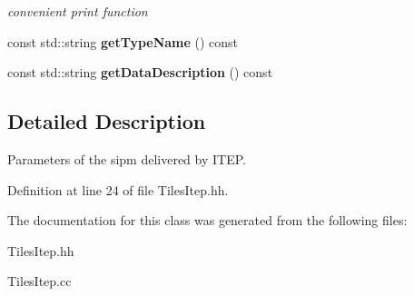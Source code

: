 \begin{DoxyCompactItemize}
\begin{DoxyCompactList}\small\item\em convenient print function \item\end{DoxyCompactList}\item 
const std::string {\bfseries getTypeName} () const \label{classCALICE_1_1TilesItep_a1a775b544e0f52b5525dc1aef0a50f41}

\item 
const std::string {\bfseries getDataDescription} () const \label{classCALICE_1_1TilesItep_a4958de37353853a6ae57adce6c345d19}

\end{DoxyCompactItemize}


\subsection{Detailed Description}
Parameters of the sipm delivered by ITEP. 

Definition at line 24 of file TilesItep.hh.

The documentation for this class was generated from the following files:\begin{DoxyCompactItemize}
\item 
TilesItep.hh\item 
TilesItep.cc\end{DoxyCompactItemize}
